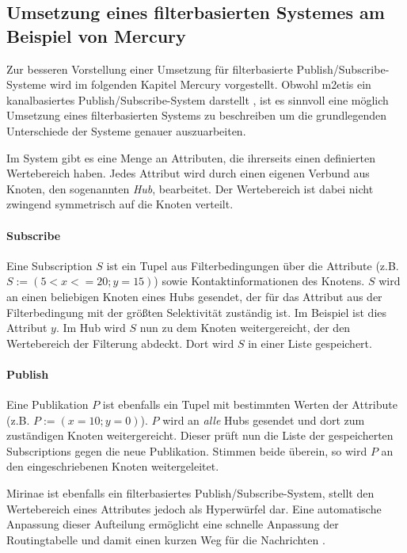 \subsection[Umsetzung eines filterbasierten Systemes]{Umsetzung eines filterbasierten Systemes am Beispiel von Mercury}
\label{chap:related:mercury}
Zur besseren Vorstellung einer Umsetzung für filterbasierte Publish/Subscribe-Systeme wird im folgenden Kapitel Mercury \cite{Bharambe2004Mercury} vorgestellt. Obwohl \ac{m2etis} ein kanalbasiertes Publish/Subscribe-System darstellt \cite{Fischer2010a}, ist es sinnvoll eine möglich Umsetzung eines filterbasierten Systems zu beschreiben um die grundlegenden Unterschiede der Systeme genauer auszuarbeiten. 

Im System gibt es eine Menge an Attributen, die ihrerseits einen definierten Wertebereich haben. Jedes Attribut wird durch einen eigenen Verbund aus Knoten, den sogenannten \emph{Hub}, bearbeitet. Der Wertebereich ist dabei nicht zwingend symmetrisch auf die Knoten verteilt.

\paragraph{Subscribe}
Eine Subscription $S$ ist ein Tupel aus Filterbedingungen über die Attribute (z.B. $S := (5 < x <= 20; y = 15)$) sowie Kontaktinformationen des Knotens. $S$ wird an einen beliebigen Knoten eines Hubs gesendet, der für das Attribut aus der Filterbedingung mit der größten Selektivität zuständig ist. Im Beispiel ist dies Attribut $y$. Im Hub wird $S$ nun zu dem Knoten weitergereicht, der den Wertebereich der Filterung abdeckt. Dort wird $S$ in einer Liste gespeichert.

\paragraph{Publish}
Eine Publikation $P$ ist ebenfalls ein Tupel mit bestimmten Werten der Attribute (z.B. $P := (x = 10; y = 0)$). $P$ wird an \emph{alle} Hubs gesendet und dort zum zuständigen Knoten weitergereicht. Dieser prüft nun die Liste der gespeicherten Subscriptions gegen die neue Publikation. Stimmen beide überein, so wird $P$ an den eingeschriebenen Knoten weitergeleitet.

Mirinae ist ebenfalls ein filterbasiertes Publish/Subscribe-System, stellt den Wertebereich eines Attributes jedoch als Hyperwürfel dar. Eine automatische Anpassung dieser Aufteilung ermöglicht eine schnelle Anpassung der Routingtabelle und damit einen kurzen Weg für die Nachrichten \cite{Choi2005Mirinae}.
